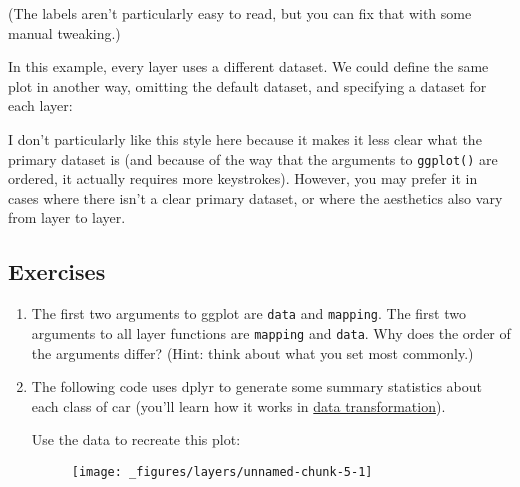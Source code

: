 (The labels aren't particularly easy to read, but you can fix that with
some manual tweaking.)

In this example, every layer uses a different dataset. We could define
the same plot in another way, omitting the default dataset, and
specifying a dataset for each layer:

\begin{Shaded}
\begin{Highlighting}[]
\NormalTok{(} \StringTok{ }
\StringTok{  }\NormalTok{(} \StringTok{ }
\StringTok{  }\NormalTok{(} \StringTok{ }
\StringTok{  }\NormalTok{(} \NormalTok{(} 
\end{Highlighting}
\end{Shaded}

I don't particularly like this style here because it makes it less clear
what the primary dataset is (and because of the way that the arguments
to \texttt{ggplot()} are ordered, it actually requires more keystrokes).
However, you may prefer it in cases where there isn't a clear primary
dataset, or where the aesthetics also vary from layer to layer.

\subsection{Exercises}

\begin{enumerate}
\def\labelenumi{\arabic{enumi}.}
\item
  The first two arguments to ggplot are \texttt{data} and
  \texttt{mapping}. The first two arguments to all layer functions are
  \texttt{mapping} and \texttt{data}. Why does the order of the
  arguments differ? (Hint: think about what you set most commonly.)
\item
  The following code uses dplyr to generate some summary statistics
  about each class of car (you'll learn how it works in
  \hyperref[cha:dplyr]{data transformation}).

\begin{Shaded}
\end{Shaded}

  Use the data to recreate this plot:

  \begin{figure}[H]
    \centering
    \texttt{[image: \_figures/layers/unnamed-chunk-5-1]}
  \end{figure}
\end{enumerate}

